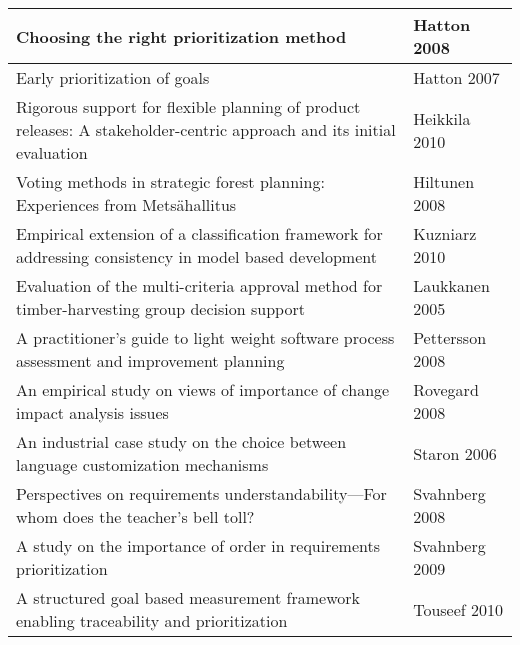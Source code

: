 \begin{center}
{\begin{tabular}{
|>{\raggedright}p{}
|>{\raggedright}p{}
|}
Choosing the right prioritization method & Hatton 2008 \cite{Hatton2008}\tabularnewline \hline
Early prioritization of goals & Hatton 2007 \cite{Hatton2007}\tabularnewline \hline
Rigorous support for flexible planning of product releases: A stakeholder-centric approach and its initial evaluation & Heikkila 2010 \cite{Heikkila2010}\tabularnewline \hline
Voting methods in strategic forest planning: Experiences from Mets\"{a}hallitus & Hiltunen 2008 \cite{Hiltunen2008}\tabularnewline \hline
Empirical extension of a classification framework for addressing consistency in model based development & Kuzniarz 2010 \cite{Kuzniarz2010}\tabularnewline \hline
Evaluation of the multi-criteria approval method for timber-harvesting group decision support & Laukkanen 2005 \cite{Laukkanen2005a} \tabularnewline \hline
A practitioner's guide to light weight software process assessment and improvement planning & Pettersson 2008 \cite{Pettersson2008} \tabularnewline \hline
An empirical study on views of importance of change impact analysis issues & Rovegard 2008 \cite{Rovegard2008} \tabularnewline \hline
An industrial case study on the choice between language customization mechanisms & Staron 2006 \cite{Staron2006} \tabularnewline \hline
Perspectives on requirements understandability---For whom does the teacher's bell toll? & Svahnberg 2008 \cite{Svahnberg2008} \tabularnewline \hline
A study on the importance of order in requirements prioritization & Svahnberg 2009 \cite{Svahnberg2009} \tabularnewline \hline
A structured goal based measurement framework enabling traceability and prioritization & Touseef 2010 \cite{Touseef2010} \tabularnewline \hline

\end{tabular}
} %
\end{center}

